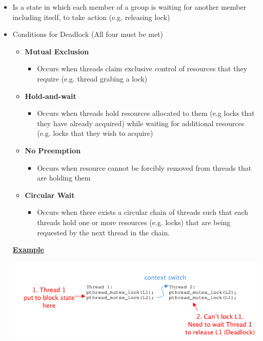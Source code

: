 \documentclass[12pt]{article}
\begin{document}
\begin{itemize}
    \item Is a state in which each member of a group is waiting for
    another member including itself, to take action (e.g. releasing lock)
    \item Conditions for Deadlock (All four must be met)

    \begin{itemize}
        \item \textbf{Mutual Exclusion}
        \begin{itemize}
            \item Occurs when threads claim exclusive control of resources that
            they require (e.g. thread grabing a lock)
        \end{itemize}
        \item \textbf{Hold-and-wait}
        \begin{itemize}
            \item Occurs when threads hold resources allocated to them (e.g locks that they have already acquired)
            while waiting for additional resources (e.g. locks that they wish to acquire)
        \end{itemize}

        \item \textbf{No Preemption}
        \begin{itemize}
            \item Occurs when resource cannot be forcibly removed from threads that are holding them
        \end{itemize}
        \item \textbf{Circular Wait}
        \begin{itemize}
            \item Occurs when there exists a circular chain of threads such that
            each threads hold one or more resources (e.g. locks) that are being
            requested by the next thread in the chain.
        \end{itemize}
    \end{itemize}

    \bigskip

    \underline{\textbf{Example}}

    \begin{center}
    \includegraphics[width=0.9\linewidth]{images/midterm_2_solution_12.png}
    \end{center}


\end{itemize}
\end{document}
